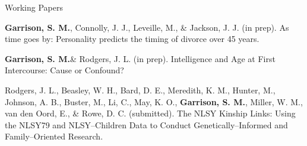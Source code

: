 \documentclass {resume}
\newcommand{\meb}{{\bf Garrison, S. M.}\xspace}
\newlength{\wideitemsep}
\let\olditem\item
\renewcommand{\item}{\setlength{\itemsep}{\wideitemsep}\olditem}
\begin{document}
\begin{comment}\begin{rSection}{\textrm{Published Abstracts}}
\begin{etaremune}\item\meb (2013). Domestic dissatis{\em fiction} or dissatis{\em fact}ion?: Gender differences in a multilevel model of marital satisfaction using prenuptial marital expectations after 20 years. [Abstract] {\em Washington University Senior Honors Thesis Abstracts. 5}, 166.\end{etaremune}\end{rSection}\end{comment}%

\begin{comment}
\begin{itemize}
\item Zhu, J. Y., \meb, Rodgers, J. L. \& Zald, D. H. (Submitted). Shaping Perseverance: Evidence of shared environmental effects on Grit and a task-based measure of persistence. Poster submitted to SPSP.
\end{itemize}
\end{comment}
\begin{rSection}{\textrm{Working Papers}}
\begin{etaremune}\item\meb, Connolly, J. J., Leveille, M., \& Jackson, J. J. (in prep). As time goes by: Personality predicts the timing of divorce over 45 years. %
\item\meb \& Rodgers, J. L. (in prep). Intelligence and Age at First Intercourse: Cause or Confound?%
\item Rodgers, J. L., Beasley, W. H., Bard, D. E., Meredith, K. M., Hunter, M., Johnson, A. B., Buster, M., Li, C., May, K. O., \meb, Miller, W. M., van den Oord, E., \& Rowe, D. C. (submitted). The NLSY Kinship Links: Using the NLSY79 and NLSY--Children Data to Conduct Genetically--Informed and Family--Oriented Research.
\end{etaremune}
\end{rSection}
\end{document}
